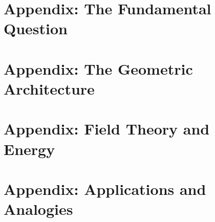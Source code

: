 \documentclass[11pt,openright,twoside]{book}
\begin{document}







\appendix

\part{Appendix: The Fundamental Question}


\part{Appendix: The Geometric Architecture}





\part{Appendix: Field Theory and Energy}



\part{Appendix: Applications and Analogies}



\end{document}
